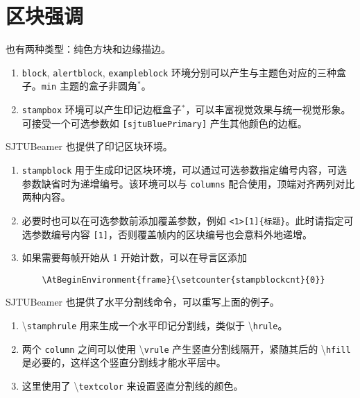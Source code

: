 \documentclass[
    UTF8,
    heading=true,
    12pt,
    a4paper
]{ctexrep}
\newenvironment{commentlist}{\begin{enumerate}\small}{\end{enumerate}}
\newcommand{\cmd}[1]{\textbackslash{}\texttt{#1}}
\newcommand{\env}[1]{\texttt{#1}}
\newcommand{\opt}[1]{\texttt{#1}}
\def\themename{\textsf{SJTUBeamer}}
\begin{document}
\section{区块强调}

也有两种类型：纯色方块和边缘描边。



\begin{commentlist}
  \item \env{block}, \env{alertblock}, \env{exampleblock} 环境分别可以产生与主题色对应的三种盒子。\opt{min} 主题的盒子非圆角$^*$。
  \item \env{stampbox} 环境可以产生印记边框盒子$^*$，可以丰富视觉效果与统一视觉形象。可接受一个可选参数如 \opt{[sjtuBluePrimary]} 产生其他颜色的边框。
\end{commentlist}

\themename{} 也提供了印记区块环境。


\begin{commentlist}
  \item \env{stampblock} 用于生成印记区块环境，可以通过可选参数指定编号内容，可选参数缺省时为递增编号。该环境可以与 \env{columns} 配合使用，顶端对齐两列对比两种内容。
  \item 必要时也可以在可选参数前添加覆盖参数，例如 \verb"<1>[1]{标题}"。此时请指定可选参数编号内容 \verb"[1]"，否则覆盖帧内的区块编号也会意料外地递增。
  \item 如果需要每帧开始从 1 开始计数，可以在导言区添加
  \begin{verbatim}
    \AtBeginEnvironment{frame}{\setcounter{stampblockcnt}{0}}
  \end{verbatim}
\end{commentlist}

\clearpage

\themename{} 也提供了水平分割线命令，可以重写上面的例子。


\begin{commentlist}
  \item \cmd{stamphrule} 用来生成一个水平印记分割线，类似于 \cmd{hrule}。
  \item 两个 \env{column} 之间可以使用 \cmd{vrule} 产生竖直分割线隔开，紧随其后的 \cmd{hfill} 是必要的，这样这个竖直分割线才能水平居中。
  \item 这里使用了 \cmd{textcolor} 来设置竖直分割线的颜色。
\end{commentlist}
\end{document}
